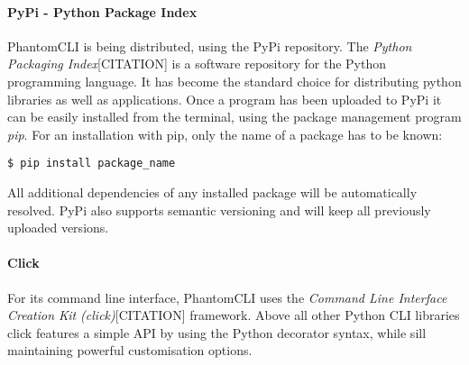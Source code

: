 \paragraph{PyPi - Python Package Index}
PhantomCLI is being distributed, using the PyPi repository. The \textit{Python Packaging Index}[CITATION] is a software repository for the Python programming language. It has become the standard choice for distributing python libraries as well as applications. Once a program has been uploaded to PyPi it can be easily installed from the terminal, using the package management program \textit{pip}. For an installation with pip, only the name of a package has to be known:

\begin{lstlisting}
$ pip install package_name
\end{lstlisting}

All additional dependencies of any installed package will be automatically resolved. PyPi also supports semantic versioning and will keep all previously uploaded versions.

\paragraph{Click}
For its command line interface, PhantomCLI uses the \textit{Command Line Interface Creation Kit (click)}[CITATION] framework. Above all other Python CLI libraries click features a simple API by using the Python decorator syntax, while sill maintaining powerful customisation options.

